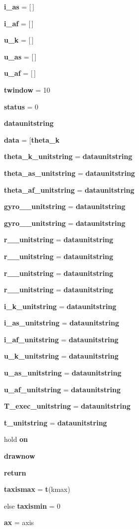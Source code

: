 \begin{DoxyCompactItemize}
\item 
{\bf i\_\-as} = [$\,$]
\item 
{\bf i\_\-af} = [$\,$]
\item 
{\bf u\_\-k} = [$\,$]
\item 
{\bf u\_\-as} = [$\,$]
\item 
{\bf u\_\-af} = [$\,$]
\item 
{\bf twindow} = 10
\item 
{\bf status} = 0
\item 
{\bf dataunitstring}
\item 
{\bf data} = [{\bf theta\_\-k}
\item 
{\bf theta\_\-k\_\-unitstring} = {\bf dataunitstring}
\item 
{\bf theta\_\-as\_\-unitstring} = {\bf dataunitstring}
\item 
{\bf theta\_\-af\_\-unitstring} = {\bf dataunitstring}
\item 
{\bf gyro\_\_\-unitstring} = {\bf dataunitstring}
\item 
{\bf gyro\_\_\-unitstring} = {\bf dataunitstring}
\item 
{\bf r\_\_\-unitstring} = {\bf dataunitstring}
\item 
{\bf r\_\_\-unitstring} = {\bf dataunitstring}
\item 
{\bf r\_\_\-unitstring} = {\bf dataunitstring}
\item 
{\bf r\_\_\-unitstring} = {\bf dataunitstring}
\item 
{\bf i\_\-k\_\-unitstring} = {\bf dataunitstring}
\item 
{\bf i\_\-as\_\-unitstring} = {\bf dataunitstring}
\item 
{\bf i\_\-af\_\-unitstring} = {\bf dataunitstring}
\item 
{\bf u\_\-k\_\-unitstring} = {\bf dataunitstring}
\item 
{\bf u\_\-as\_\-unitstring} = {\bf dataunitstring}
\item 
{\bf u\_\-af\_\-unitstring} = {\bf dataunitstring}
\item 
{\bf T\_\-exec\_\-unitstring} = {\bf dataunitstring}
\item 
{\bf t\_\-unitstring} = {\bf dataunitstring}
\item 
hold {\bf on}
\item 
{\bf drawnow}
\item 
{\bf return}
\item 
{\bf taxismax} = {\bf t}(kmax)
\item 
else {\bf taxismin} = 0
\item 
{\bf ax} = axis
\end{DoxyCompactItemize}


